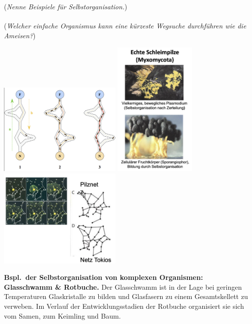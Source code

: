 \\\\
(\dangersign \textit{Nenne Beispiele für Selbstorganisation.})
\\\\
(\dangersign \textit{Welcher einfache Organismus kann eine kürzeste Wegsuche durchführen wie die Ameisen?})

\begin{center}
    \includegraphics[width=6cm]{lec6/figures/ameisenalg.png}
    \hfill
    \includegraphics[width=4cm]{lec6/figures/schleimpilz.png}
    \hfill
    \includegraphics[width=6cm]{lec6/figures/japan.png}
\end{center}
\textbf{Bspl.\ der Selbstorganisation von komplexen Organismen: Glasschwamm \& Rotbuche.} Der Glasschwamm ist in der Lage bei geringen Temperaturen Glaskristalle zu bilden und Glasfasern zu einem Gesamtskellett zu verweben. Im Verlauf der Entwicklungsstadien der Rotbuche organisiert sie sich vom Samen, zum Keimling und Baum.
